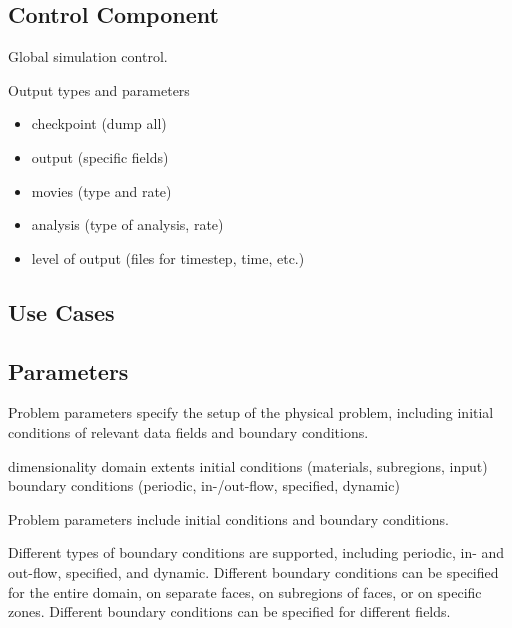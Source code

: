 \subsection{Control Component} \label{ss:component-control}


Global simulation control.

Output types and parameters

\begin{itemize}
\item checkpoint (dump all)
\item output (specific fields)
\item movies (type and rate)
\item analysis (type of analysis, rate)
\item level of output (files for timestep, time, etc.)
\end{itemize}

\subsection{Use Cases}
\subsection{Parameters}

Problem parameters specify the setup of the physical problem,
including initial conditions of relevant data fields and boundary
conditions.

  dimensionality
  domain extents
  initial conditions (materials, subregions, input)
 boundary conditions (periodic, in-/out-flow, specified, dynamic)

Problem parameters include initial conditions and boundary conditions.

Different types of boundary conditions are supported, including
periodic, in- and out-flow, specified, and dynamic.  Different
boundary conditions can be specified for the entire domain, on
separate faces, on subregions of faces, or on specific zones.
Different boundary conditions can be specified for different fields.
